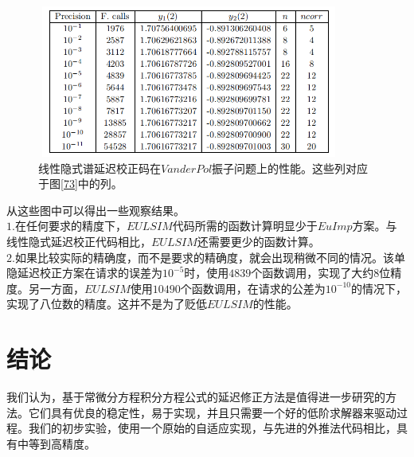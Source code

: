 \documentclass[12pt,a4paper]{article}
\begin{document}
\begin{figure}[h]
	\centering
	\includegraphics[width=10cm,height=5cm]{./figures/74.png}
	\caption{线性隐式谱延迟校正码在$Van der Pol$振子问题上的性能。这些列对应于图\ref{73}中的列。}
	\label{74}
\end{figure}
从这些图中可以得出一些观察结果。\\

$1$.在任何要求的精度下，$EULSIM$代码所需的函数计算明显少于$EuImp$方案。与线性隐式延迟校正代码相比，$EULSIM$还需要更少的函数计算。\\

$2$.如果比较实际的精确度，而不是要求的精确度，就会出现稍微不同的情况。该单隐延迟校正方案在请求的误差为$10^{-5}$时，使用$4839$个函数调用，实现了大约8位精度。另一方面，$EULSIM$使用$10490$个函数调用，在请求的公差为$10^{-10}$的情况下，实现了八位数的精度。这并不是为了贬低$EULSIM$的性能。\\


\section{结论}

我们认为，基于常微分方程积分方程公式的延迟修正方法是值得进一步研究的方法。它们具有优良的稳定性，易于实现，并且只需要一个好的低阶求解器来驱动过程。我们的初步实验，使用一个原始的自适应实现，与先进的外推法代码相比，具有中等到高精度。\\




\cite{tam19912d}

\end{document}
